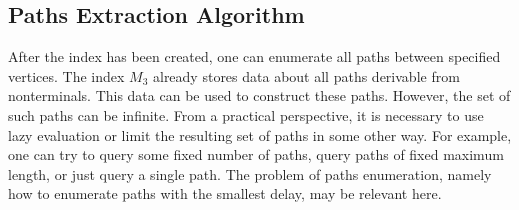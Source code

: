 \subsection{Paths Extraction Algorithm}
After the index has been created, one can enumerate all paths between specified vertices.
The index $M_3$ already stores data about all paths derivable from nonterminals.
This data can be used to construct these paths. However, the set of such paths can be infinite.
From a practical perspective, it is necessary to use lazy evaluation or limit the resulting set of paths in some other way.
For example, one can try to query some fixed number of paths, query paths of fixed maximum length, or just query a single path.
The problem of paths enumeration, namely how to enumerate paths with the smallest delay, may be relevant here.

